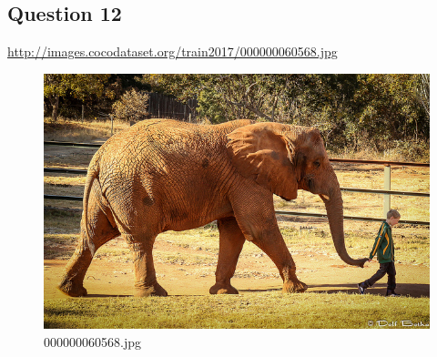 \subsection*{Question 12}
\url{http://images.cocodataset.org/train2017/000000060568.jpg}
    \begin{figure}[h]
        \centering
        \includegraphics[width=0.8\linewidth]{../image set/easy/000000060568.jpg}
        \caption{000000060568.jpg}
    \end{figure}

